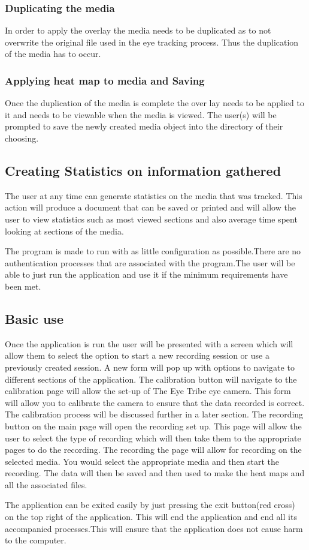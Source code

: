 \subsubsection{Duplicating the media}
In order to apply the overlay the media needs to be duplicated as to not overwrite the original file used in the eye tracking process. Thus the duplication of the media has to occur.

\subsubsection{Applying heat map to media and Saving}
Once the duplication of the media is complete the over lay needs to be applied to it and needs to be viewable when the media is viewed. The user(s) will be prompted to save the newly created media object into the directory of their choosing.

\subsection{Creating Statistics on information gathered}
The user at any time can generate statistics on the  media that was tracked. This action will produce a document that can be saved or printed and will allow the user to view statistics such as most viewed sections and also average time spent looking at sections of the media.
\fi

The program is made to run with as little configuration as possible.There are no authentication processes that are associated with the program.The user will be able to just run the application and use it if the minimum requirements have been met.

\subsection{Basic use}
Once the application is run the user will be presented with a screen which will allow them to select the option to start a new recording session or use a previously created session. A new form will pop up with options to navigate to different sections of the application. The calibration button will navigate to the calibration page will allow the set-up of The Eye Tribe eye camera. This form will allow you to calibrate the camera to ensure that the data recorded is correct. The calibration process will be discussed further in a later section. The recording button on the main page will open the recording set up. This page will allow the user to select the type of recording which will then take them to the appropriate pages to do the recording. The recording the page will allow for recording on the selected media. You would select the appropriate media and then start the recording. The data will then be saved and then used to make the heat maps and all the associated files.\newline

The application can be exited easily by just pressing the exit button(red cross) on the top right of the application. This will end the application and end all its accompanied processes.This will ensure that the application does not cause harm to the computer.


